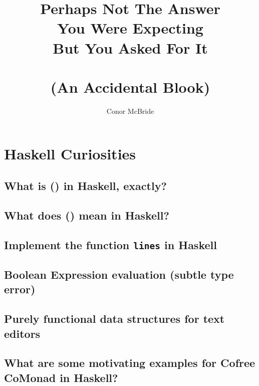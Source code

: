 \documentclass{book}
\begin{document}
\title{Perhaps Not The Answer\\
       You Were Expecting\\
       But You Asked For It\\ ~\\
     (An Accidental Blook)}
\author{Conor McBride}
\maketitle

\tableofcontents

\chapter{Haskell Curiosities}

\section{What is () in Haskell, exactly?}


\section{What does () mean in Haskell?}


\section{Implement the function {\tt lines} in Haskell}


\section{Boolean Expression evaluation (subtle type error)}


\section{Purely functional data structures for text editors}


\section{What are some motivating examples for Cofree CoMonad in Haskell?}

\end{document}
